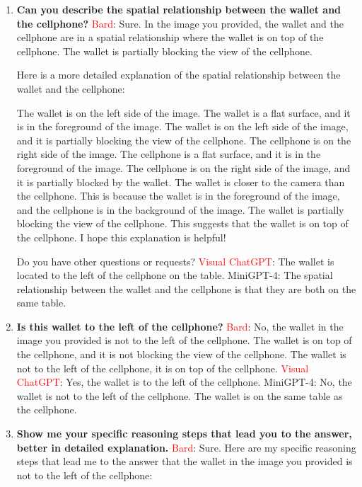 \begin{enumerate}
    \item \textbf{Can you describe the spatial relationship between the wallet and the cellphone?}
    \subitem \textcolor{Red}{Bard}: 
    Sure. In the image you provided, the wallet and the cellphone are in a spatial relationship where the wallet is on top of the cellphone. The wallet is partially blocking the view of the cellphone.

    Here is a more detailed explanation of the spatial relationship between the wallet and the cellphone:

    The wallet is on the left side of the image. The wallet is a flat surface, and it is in the foreground of the image. The wallet is on the left side of the image, and it is partially blocking the view of the cellphone.
    The cellphone is on the right side of the image. The cellphone is a flat surface, and it is in the foreground of the image. The cellphone is on the right side of the image, and it is partially blocked by the wallet.
    The wallet is closer to the camera than the cellphone. This is because the wallet is in the foreground of the image, and the cellphone is in the background of the image.
    The wallet is partially blocking the view of the cellphone. This suggests that the wallet is on top of the cellphone.
    I hope this explanation is helpful!

    Do you have other questions or requests?
    \subitem \textcolor{red}{Visual ChatGPT}: The wallet is located to the left of the cellphone on the table.
    \subitem MiniGPT-4: The spatial relationship between the wallet and the cellphone is that they are both on the same table.
    \item \textbf{Is this wallet to the left of the cellphone?}
    \subitem \textcolor{Red}{Bard}: 
    No, the wallet in the image you provided is not to the left of the cellphone. The wallet is on top of the cellphone, and it is not blocking the view of the cellphone. The wallet is not to the left of the cellphone, it is on top of the cellphone.
    \subitem \textcolor{red}{Visual ChatGPT}: Yes, the wallet is to the left of the cellphone.
    \subitem MiniGPT-4: No, the wallet is not to the left of the cellphone. The wallet is on the same table as the cellphone.
    \item \textbf{Show me your specific reasoning steps that lead you to the answer, better in detailed explanation.}
    \subitem \textcolor{Red}{Bard}: 
    Sure. Here are my specific reasoning steps that lead me to the answer that the wallet in the image you provided is not to the left of the cellphone:
    

\end{enumerate}

